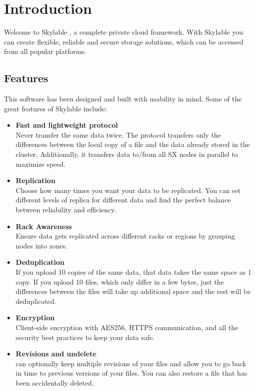 \chapter{Introduction}
Welcome to Skylable \SX, a complete private cloud framework. With Skylable \SX
you can create flexible, reliable and secure storage solutions, which can
be accessed from all popular platforms.

\section{\ifpdf\texorpdfstring{\SX Features}{SX Features}\fi}
This software has been designed and built with usability in mind. Some
of the great features of Skylable \SX include:
\begin{itemize}
    \item \textbf{Fast and lightweight protocol}\\
    Never transfer the same data twice. The \SX protocol transfers only the
    differences between the local copy of a file and the data already stored
    in the cluster. Additionally, it transfers data to/from all SX nodes in
    parallel to maximize speed.

    \item \textbf{Replication}\\
    Choose how many times you want your data to be replicated. You can set
    different levels of replica for different data and find the perfect
    balance between reliability and efficiency.

    \item \textbf{Rack Awareness}\\
    Ensure data gets replicated across different racks or regions by grouping
    nodes into zones.

    \item \textbf{Deduplication}\\
    If you upload 10 copies of the same data, that data takes the same
    space as 1 copy. If you upload 10 files, which only differ in a few bytes,
    just the differences between the files will take up additional space and
    the rest will be deduplicated.

    \item \textbf{Encryption}\\
    Client-side encryption with AES256, HTTPS communication, and all the
    security best practices to keep your data safe.

    \item \textbf{Revisions and undelete}\\
    \SX can optionally keep multiple revisions of your files and allow you to
    go back in time to previous versions of your files. You can also restore
    a file that has been accidentally deleted.


\end{itemize}
